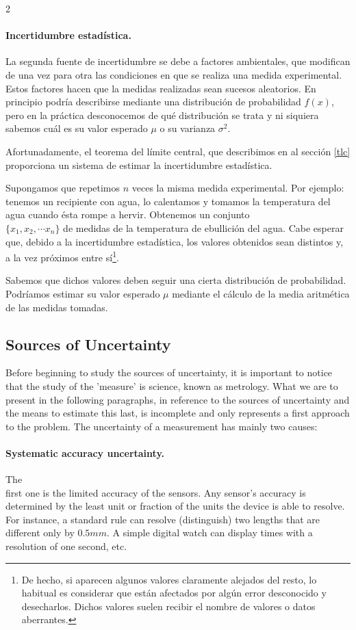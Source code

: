 \begin{paracol}{2}
\paragraph{Incertidumbre estadística.} La segunda fuente de incertidumbre se debe a factores ambientales, que modifican de una vez para otra las condiciones en que se realiza una medida experimental. Estos factores hacen que la medidas realizadas sean sucesos aleatorios. En principio podría describirse mediante una distribución de probabilidad $f(x)$, pero en la práctica desconocemos de qué distribución se trata y ni siquiera sabemos cuál es su valor esperado $\mu$ o su varianza $\sigma^2$. 

Afortunadamente, el teorema del límite central, que describimos en al sección \ref{tlc} proporciona un sistema de estimar la incertidumbre estadística.

Supongamos que repetimos $n$ veces la misma medida experimental. Por ejemplo: tenemos un recipiente con agua, lo calentamos y tomamos la temperatura del agua cuando ésta rompe a hervir. Obtenemos un conjunto\\ $\{x_1,x_2,\cdots x_n \}$ de medidas de la temperatura de ebullición del agua. Cabe esperar que, debido a la incertidumbre estadística, los valores obtenidos sean distintos  y, a la vez próximos entre sí\footnote{De hecho, si aparecen algunos valores claramente alejados del resto, lo habitual es considerar que están afectados por algún error desconocido y desecharlos. Dichos valores suelen recibir el nombre de valores o datos aberrantes.}.

Sabemos que dichos valores deben seguir una cierta distribución de probabilidad. Podría\-mos estimar su valor esperado $\mu$ mediante el cálculo de la media aritmética de las medidas tomadas.
\switchcolumn
\subsection{Sources of Uncertainty}\label{fdii}
Before beginning to study the sources of uncertainty, it is important to notice that the study of the 'measure' is science, known as metrology. What we are to present in the following paragraphs, in reference to the sources of uncertainty and the means to estimate this last, is incomplete and only represents a first approach to the problem. The uncertainty of a measurement has mainly two causes:

\paragraph{Systematic accuracy uncertainty.}
The\\ first one is the limited accuracy of the sensors. Any sensor's accuracy is determined by the least unit or fraction of the units the device is able to resolve. For instance, a standard rule can resolve (distinguish) two lengths that are different only by $0.5mm$. A simple digital watch can display times with a resolution of one second, etc.


\end{paracol}
